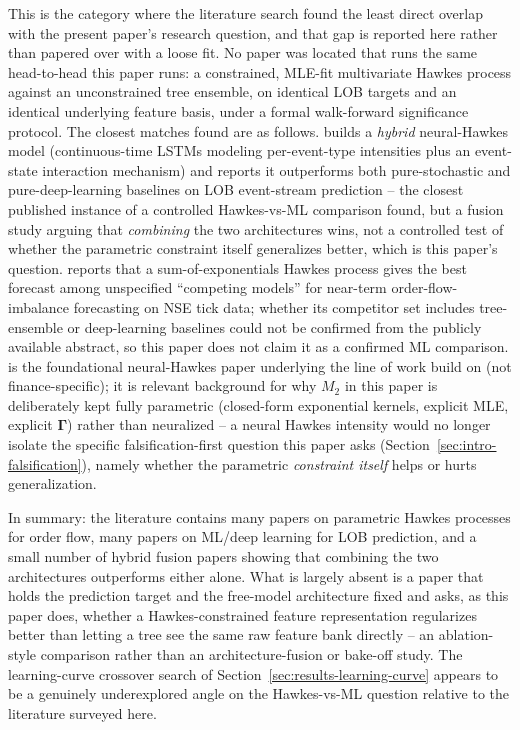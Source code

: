 This is the category where the literature search found the least direct
overlap with the present paper's research question, and that gap is
reported here rather than papered over with a loose fit. No paper was
located that runs the same head-to-head this paper runs: a constrained,
MLE-fit multivariate Hawkes process against an unconstrained tree
ensemble, on identical LOB targets and an identical underlying feature
basis, under a formal walk-forward significance protocol. The closest
matches found are as follows. \citet{shi2022state} builds a \emph{hybrid}
neural-Hawkes model (continuous-time LSTMs modeling per-event-type
intensities plus an event-state interaction mechanism) and reports it
outperforms both pure-stochastic and pure-deep-learning baselines on LOB
event-stream prediction -- the closest published instance of a controlled
Hawkes-vs-ML comparison found, but a fusion study arguing that
\emph{combining} the two architectures wins, not a controlled test of
whether the parametric constraint itself generalizes better, which is
this paper's question. \citet{nitturanantha2026forecasting} reports that
a sum-of-exponentials Hawkes process gives the best forecast among
unspecified ``competing models'' for near-term order-flow-imbalance
forecasting on NSE tick data; whether its competitor set includes
tree-ensemble or deep-learning baselines could not be confirmed from the
publicly available abstract, so this paper does not claim it as a
confirmed ML comparison. \citet{mei2017neural} is the foundational
neural-Hawkes paper underlying the line of work
\citeauthor{shi2022state} build on (not finance-specific); it is relevant
background for why $M_2$ in this paper is deliberately kept fully
parametric (closed-form exponential kernels, explicit MLE, explicit
$\boldsymbol\Gamma$) rather than neuralized -- a neural Hawkes intensity
would no longer isolate the specific falsification-first question this
paper asks (Section~\ref{sec:intro-falsification}), namely whether the
parametric \emph{constraint itself} helps or hurts generalization.

In summary: the literature contains many papers on parametric Hawkes
processes for order flow, many papers on ML/deep learning for LOB
prediction, and a small number of hybrid fusion papers showing that
combining the two architectures outperforms either alone. What is
largely absent is a paper that holds the prediction target and the
free-model architecture fixed and asks, as this paper does, whether a
Hawkes-constrained feature representation regularizes better than letting
a tree see the same raw feature bank directly -- an ablation-style
comparison rather than an architecture-fusion or bake-off study. The
learning-curve crossover search of Section~\ref{sec:results-learning-curve}
appears to be a genuinely underexplored angle on the Hawkes-vs-ML
question relative to the literature surveyed here.

